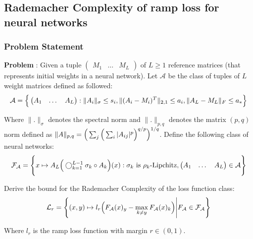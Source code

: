 \newpage
\subsection{Rademacher Complexity of ramp loss for neural networks}
\subsubsection{Problem Statement}
\textbf{Problem} : Given a tuple $\begin{pmatrix}M_1 & \dots & M_L\end{pmatrix}$ of $L\ge 1$ reference matrices (that represents initial weights in a neural network). Let $\mathcal{A}$ be the class of tuples of $L$ weight matrices defined as followed:
\begin{align*}
    \mathcal{A} = \Big\{ 
        \begin{pmatrix}
            A_1 & \dots & A_L
        \end{pmatrix} : \|A_i\|_\sigma \le s_i, \|(A_i - M_i)^T\|_{2, 1}\le a_i, \|A_L - M_L\|_F \le a_*
     \Big\}
\end{align*}

\noindent Where $\|.\|_\sigma$ denotes the spectral norm and $\|.\|_{p, q}$ denotes the matrix $(p, q)$ norm defined as $\|A\|_{p, q} = \Big( \sum_j\Big( \sum_{i}|A_{ij}|^p \Big)^{q/p} \Big)^{1/q}$. Define the following class of neural networks:
\begin{align*}
    \mathcal{F}_\mathcal{A} = \Bigg\{ 
        x\mapsto A_L \Big( 
            \bigcirc_{k=1}^{L-1} \sigma_k \circ A_k
         \Big)(x) : \sigma_k \text{ is } \rho_k\text{-Lipchitz}, \begin{pmatrix}
            A_1 & \dots & A_L
        \end{pmatrix} \in \mathcal{A}
     \Bigg\}
\end{align*}

\noindent Derive the bound for the Rademacher Complexity of the loss function class:
\begin{align*}
    \mathcal{L}_r = \Bigg\{ 
        (x, y) \mapsto l_r\Big( 
            F_\mathcal{A}(x)_y - \max_{k\ne y}F_\mathcal{A}(x)_k
         \Big) \Bigg| F_\mathcal{A} \in \mathcal{F}_\mathcal{A}
     \Bigg\}
\end{align*}

\noindent Where $l_r$ is the ramp loss function with margin $r\in(0,1)$.
